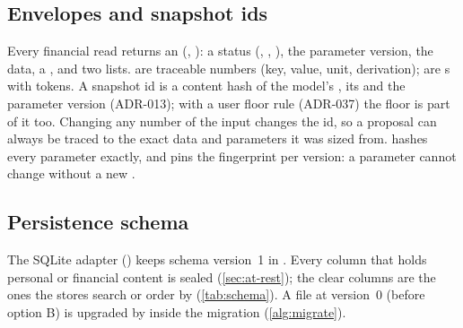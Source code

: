 \subsection{Envelopes and snapshot ids}\label{sec:envelope}

Every financial read returns an  (, ):
a status (, , ), the parameter version, the data, a
, and two lists.  are traceable numbers (key, value, unit, derivation);  are
s with  tokens. A snapshot id is a content hash of the model's ,
its  and the parameter version (ADR-013); with a user floor rule (ADR-037) the floor is part of it too.
Changing any number of the input changes the id, so a proposal can always be traced to the exact data and parameters
it was sized from.  hashes every parameter exactly, and
 pins the fingerprint per version: a parameter cannot change without a new
.

\subsection{Persistence schema}\label{sec:schema}

The SQLite adapter () keeps schema version~1 in .
Every column that holds personal or financial content is sealed (\cref{sec:at-rest}); the clear columns are the ones
the stores search or order by (\cref{tab:schema}). A file at version~0 (before option B) is upgraded by
 inside the migration (\cref{alg:migrate}).

